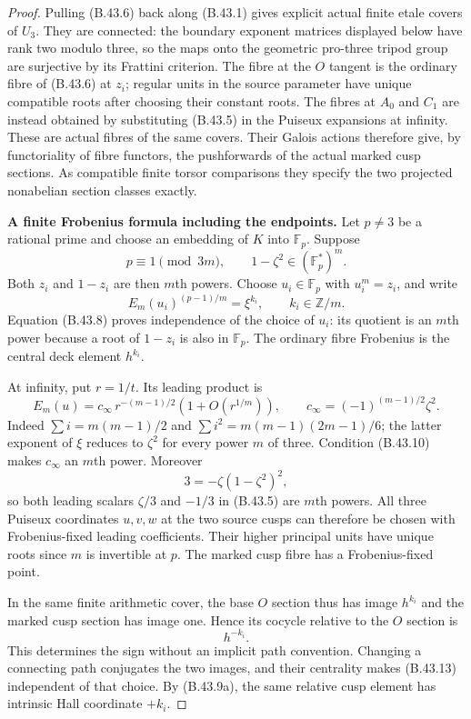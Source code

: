 \begin{proof}
Pulling (B.43.6) back along (B.43.1) gives explicit actual
finite etale covers of $U_3$.  They are connected: the
boundary exponent matrices displayed below have rank two
modulo three, so the maps onto the geometric pro-three
tripod group are surjective by its Frattini criterion.
The fibre at the $O$ tangent is the ordinary fibre of
(B.43.6) at $z_i$; regular units in the source parameter
have unique compatible roots after choosing their constant
roots.  The fibres at $A_0$ and $C_1$ are instead obtained
by substituting (B.43.5) in the Puiseux expansions at infinity.
These are actual fibres of the same covers.  Their Galois
actions therefore give, by functoriality of fibre functors,
the pushforwards of the actual marked cusp sections.
As compatible finite torsor comparisons they specify
the two projected nonabelian section classes exactly.

\par\smallskip\noindent\textbf{A finite Frobenius formula including the endpoints.}
Let $p\ne3$ be a rational prime and choose an embedding of
$K$ into $\mathbb F_p$.  Suppose
\[
 p\equiv1\pmod{3m},\qquad 1-\zeta^2\in(\mathbb F_p^*)^m.
                                                               \tag{B.43.10}
\]
Both $z_i$ and $1-z_i$ are then $m$th powers.  Choose
$u_i\in\mathbb F_p$ with $u_i^m=z_i$, and write
\[
 E_m(u_i)^{(p-1)/m}=\xi^{k_i},\qquad k_i\in\mathbb Z/m.
                                                               \tag{B.43.11}
\]
Equation (B.43.8) proves independence of the choice of
$u_i$: its quotient is an $m$th power because a root of
$1-z_i$ is also in $\mathbb F_p$.  The ordinary fibre
Frobenius is the central deck element $h^{k_i}$.

At infinity, put $r=1/t$.  Its leading product is
\[
 E_m(u)=c_\infty\,r^{-(m-1)/2}
                  (1+O(r^{1/m})),\qquad
 c_\infty=(-1)^{(m-1)/2}\zeta^2.                            \tag{B.43.12}
\]
Indeed $\sum i=m(m-1)/2$ and
$\sum i^2=m(m-1)(2m-1)/6$; the latter exponent of $\xi$
reduces to $\zeta^2$ for every power $m$ of three.
Condition (B.43.10) makes $c_\infty$ an $m$th power.
Moreover
\[
 3=-\zeta(1-\zeta^2)^2,
\]
so both leading scalars $\zeta/3$ and $-1/3$ in
(B.43.5) are $m$th powers.  All three Puiseux coordinates
$u,v,w$ at the two source cusps can therefore be chosen
with Frobenius-fixed leading coefficients.  Their higher
principal units have unique roots since $m$ is invertible
at $p$.  The marked cusp fibre has a Frobenius-fixed point.

In the same finite arithmetic cover, the base $O$ section
thus has image $h^{k_i}$ and the marked cusp section has
image one.  Hence its cocycle relative to the $O$ section is
\[
                   h^{-k_i}.                              \tag{B.43.13}
\]
This determines the sign without an implicit path convention.
Changing a connecting path conjugates the two images, and
their centrality makes (B.43.13) independent of that choice.
By (B.43.9a), the same relative cusp element has intrinsic
Hall coordinate $+k_i$.


\end{proof}
